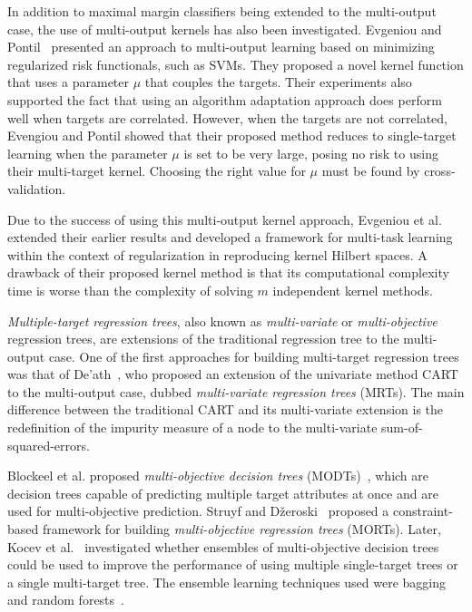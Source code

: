 \documentclass[reqno]{vcuthesis}
\numberwithin{equation}{chapter}
\begin{document}
In addition to maximal margin classifiers being extended to the multi-output case, the use of multi-output kernels has also been investigated. Evgeniou and Pontil~\cite{evgeniou2004regularized} presented an approach to multi-output learning based on minimizing regularized risk functionals, such as SVMs. They proposed a novel kernel function that uses a parameter $\mu$ that couples the targets. Their experiments also supported the fact that using an algorithm adaptation approach does perform well when targets are correlated. However, when the targets are not correlated, Evengiou and Pontil showed that their proposed method reduces to single-target learning when the parameter $\mu$ is set to be very large, posing no risk to using their multi-target kernel. Choosing the right value for $\mu$ must be found by cross-validation. 

Due to the success of using this multi-output kernel approach, Evgeniou et al.~\cite{Evgeniou2005} extended their earlier results and developed a framework for multi-task learning within the context of regularization in reproducing kernel Hilbert spaces. A drawback of their proposed kernel method is that its computational complexity time is worse than the complexity of solving $m$ independent kernel methods.

\textit{Multiple-target regression trees}, also known as \textit{multi-variate} or \textit{multi-objective} regression trees, are extensions of the traditional regression tree to the multi-output case. One of the first approaches for building multi-target regression trees was that of De'ath~\cite{de2002multivariate}, who proposed an extension of the univariate method CART~\cite{breiman1984classification} to the multi-output case, dubbed \textit{multi-variate regression trees} (MRTs). The main difference between the traditional CART and its multi-variate extension is the redefinition of the impurity measure of a node to the multi-variate sum-of-squared-errors.

Blockeel et al. proposed \textit{multi-objective decision trees} (MODTs)~\cite{blockeel1998top,kocev2009using}, which are decision trees capable of predicting multiple target attributes at once and are used for multi-objective prediction. Struyf and D{\v{z}}eroski~\cite{struyf2005constraint} proposed a constraint-based framework for building \textit{multi-objective regression trees} (MORTs). Later, Kocev et al.~\cite{Kocev2007} investigated whether ensembles of multi-objective decision trees could be used to improve the performance of using multiple single-target trees or a single multi-target tree. The ensemble learning techniques used were bagging~\cite{Breiman1996} and random forests~\cite{breiman2001random}.
\end{document}
